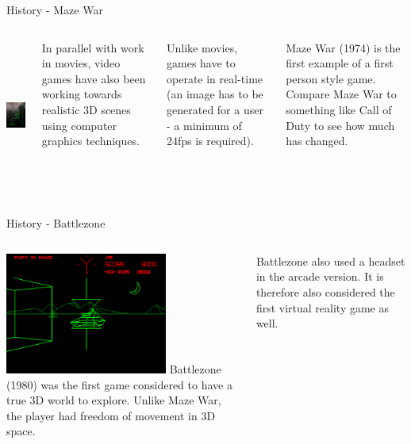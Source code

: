 \documentclass[handout,18pt]{beamer}
\begin{document}
\begin{frame}{History - Maze War}
\begin{columns}
\includegraphics[height=5cm]{mazewar.jpg}

\vspace{10pt}
In parallel with work in movies, video games have also been working towards realistic 3D scenes using computer graphics techniques.

\vspace{11pt}
Unlike movies, games have to operate in real-time (an image has to be generated for a user - a minimum of 24fps is required).

\vspace{11pt}
Maze War (1974) is the first example of a first person style game.  Compare Maze War to something like Call of Duty to see how much has changed.
\end{columns}
\end{frame}

\begin{frame}{History - Battlezone}
\begin{columns}
\centering
\includegraphics[height=4cm]{battlezone.png}
Battlezone (1980) was the first game considered to have a true 3D world to explore.  Unlike Maze War, the player had freedom of movement in 3D space.

\vspace{11pt}
Battlezone also used a headset in the arcade version.  It is therefore also considered the first virtual reality game as well.
\end{columns}
\end{frame}
\end{document}
